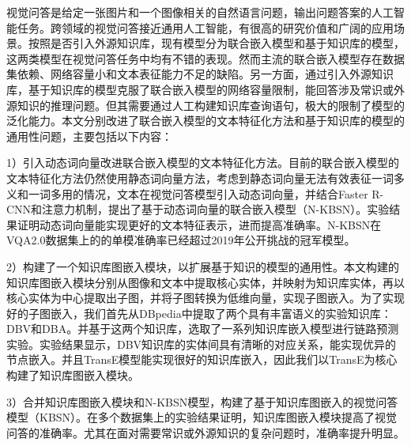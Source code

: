 	
\begin{chineseabstract}
视觉问答是给定一张图片和一个图像相关的自然语言问题，输出问题答案的人工智能任务。跨领域的视觉问答接近通用人工智能，有很高的研究价值和广阔的应用场景。按照是否引入外源知识库，现有模型分为联合嵌入模型和基于知识库的模型，这两类模型在视觉问答任务中均有不错的表现。然而主流的联合嵌入模型存在数据集依赖、网络容量小和文本表征能力不足的缺陷。另一方面，通过引入外源知识库，基于知识库的模型克服了联合嵌入模型的网络容量限制，能回答涉及常识或外源知识的推理问题。但其需要通过人工构建知识库查询语句，极大的限制了模型的泛化能力。本文分别改进了联合嵌入模型的文本特征化方法和基于知识库的模型的通用性问题，主要包括以下内容：

1）引入动态词向量改进联合嵌入模型的文本特征化方法。目前的联合嵌入模型的文本特征化方法仍然使用静态词向量方法，考虑到静态词向量无法有效表征一词多义和一词多用的情况，文本在视觉问答模型引入动态词向量，并结合Faster R-CNN和注意力机制，提出了基于动态词向量的联合嵌入模型（N-KBSN）。实验结果证明动态词向量能实现更好的文本特征表示，进而提高准确率。N-KBSN在VQA2.0数据集上的的单模准确率已经超过2019年公开挑战的冠军模型。

2）构建了一个知识库图嵌入模块，以扩展基于知识的模型的通用性。本文构建的知识库图嵌入模块分别从图像和文本中提取核心实体，并映射为知识库实体，再以核心实体为中心提取出子图，并将子图转换为低维向量，实现子图嵌入。为了实现好的子图嵌入，我们首先从DBpedia中提取了两个具有丰富语义的实验知识库：DBV和DBA。并基于这两个知识库，选取了一系列知识库嵌入模型进行链路预测实验。实验结果显示，DBV知识库的实体间具有清晰的对应关系，能实现优异的节点嵌入。并且TransE模型能实现很好的知识库嵌入，因此我们以TransE为核心构建了知识库图嵌入模块。

3）合并知识库图嵌入模块和N-KBSN模型，构建了基于知识库图嵌入的视觉问答模型（KBSN）。在多个数据集上的实验结果证明，知识库图嵌入模块提高了视觉问答的准确率。尤其在面对需要常识或外源知识的复杂问题时，准确率提升明显。

\end{chineseabstract}

